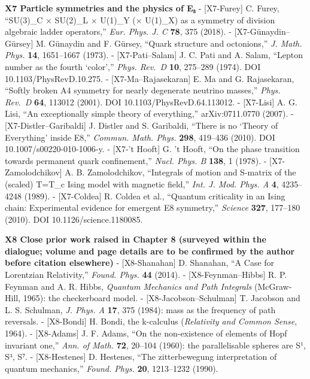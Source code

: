 \documentclass[
  a4paper,
]{article}
\begin{document}
\textbf{X7 Particle symmetries and the physics of E₈} - {[}X7-Furey{]}
C. Furey, ``SU(3)\_C × SU(2)\_L × U(1)\_Y (× U(1)\_X) as a symmetry of
division algebraic ladder operators,'' \emph{Eur. Phys. J. C}
\textbf{78}, 375 (2018). - {[}X7-Günaydin--Gürsey{]} M. Günaydin and F.
Gürsey, ``Quark structure and octonions,'' \emph{J. Math. Phys.}
\textbf{14}, 1651--1667 (1973). - {[}X7-Pati--Salam{]} J. C. Pati and A.
Salam, ``Lepton number as the fourth `color','' \emph{Phys. Rev.~D}
\textbf{10}, 275--289 (1974). DOI 10.1103/PhysRevD.10.275. -
{[}X7-Ma--Rajasekaran{]} E. Ma and G. Rajasekaran, ``Softly broken A4
symmetry for nearly degenerate neutrino masses,'' \emph{Phys. Rev.~D}
\textbf{64}, 113012 (2001). DOI 10.1103/PhysRevD.64.113012. -
{[}X7-Lisi{]} A. G. Lisi, ``An exceptionally simple theory of
everything,'' arXiv:0711.0770 (2007). - {[}X7-Distler--Garibaldi{]} J.
Distler and S. Garibaldi, ``There is no `Theory of Everything' inside
E8,'' \emph{Commun. Math. Phys.} \textbf{298}, 419--436 (2010). DOI
10.1007/s00220-010-1006-y. - {[}X7-'t Hooft{]} G. 't Hooft, ``On the
phase transition towards permanent quark confinement,'' \emph{Nucl.
Phys. B} \textbf{138}, 1 (1978). - {[}X7-Zamolodchikov{]} A. B.
Zamolodchikov, ``Integrals of motion and S-matrix of the (scaled) T=T\_c
Ising model with magnetic field,'' \emph{Int. J. Mod. Phys. A}
\textbf{4}, 4235--4248 (1989). - {[}X7-Coldea{]} R. Coldea et al.,
``Quantum criticality in an Ising chain: Experimental evidence for
emergent E8 symmetry,'' \emph{Science} \textbf{327}, 177--180 (2010).
DOI 10.1126/science.1180085.

\textbf{X8 Close prior work raised in Chapter 8 (surveyed within the
dialogue; volume and page details are to be confirmed by the author
before citation elsewhere)} - {[}X8-Shanahan{]} D. Shanahan, ``A Case
for Lorentzian Relativity,'' \emph{Found. Phys.} \textbf{44} (2014). -
{[}X8-Feynman--Hibbs{]} R. P. Feynman and A. R. Hibbs, \emph{Quantum
Mechanics and Path Integrals} (McGraw-Hill, 1965): the checkerboard
model. - {[}X8-Jacobson--Schulman{]} T. Jacobson and L. S. Schulman,
\emph{J. Phys. A} \textbf{17}, 375 (1984): mass as the frequency of path
reversals. - {[}X8-Bondi{]} H. Bondi, the k-calculus (\emph{Relativity
and Common Sense}, 1964). - {[}X8-Adams{]} J. F. Adams, ``On the
non-existence of elements of Hopf invariant one,'' \emph{Ann. of Math.}
\textbf{72}, 20--104 (1960): the parallelisable spheres are S¹, S³, S⁷.
- {[}X8-Hestenes{]} D. Hestenes, ``The zitterbewegung interpretation of
quantum mechanics,'' \emph{Found. Phys.} \textbf{20}, 1213--1232 (1990).
\end{document}
